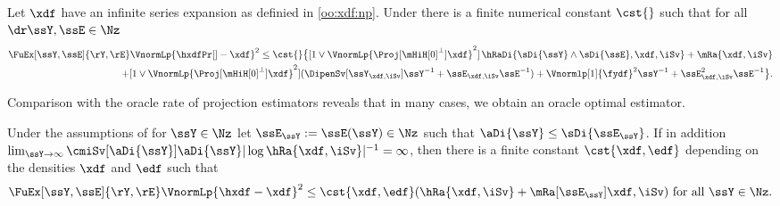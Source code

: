 \begin{thm}\label{THM_FREQ_CIRCDECONV_UNKNOWN_IID_ORACLE_NP}
\label{re:au:ub:np} Let $\xdf$ have an infinite series expansion
  as definied in \ref{oo:xdf:np}. Under  there is a finite numerical
  constant $\cst{}$ such that for all $\dr\ssY,\ssE\in\Nz$
\begin{multline}\label{re:au:ub:np:e1}
\FuEx[\ssY,\ssE]{\rY,\rE}\VnormLp{\hxdfPr[]-\xdf}^2\leq
\cst{}\big\{[1\vee\VnormLp{\Proj[{\mHiH[0]^\perp}]\xdf}^2]\,\hRaDi{\sDi{\ssY}\wedge\sDi{\ssE},\xdf,\iSv}+\mRa{\xdf,\iSv}\\
\hfill+[1\vee\VnormLp{\Proj[{\mHiH[0]^\perp}]\xdf}^2](\DipenSv[\ssY_{\xdf,\iSv}]\ssY^{-1}+\ssE_{\xdf,\iSv}\ssE^{-1})+\Vnormlp[1]{\fydf}^2\ssY^{-1}+\ssE_{\xdf,\iSv}^2\ssE^{-1}\big\}.
\end{multline}
\end{thm}

Comparison with the oracle rate of projection estimators reveals that in many cases, we obtain an oracle optimal estimator.

\begin{cor}\label{COR_FREQ_CIRCDECONV_UNKNOWN_IID_ORACLE_NP}
Under the assumptions of
    for  $\ssY\in\Nz$ let
  $\ssE_{\ssY}:=\ssE(\ssY)\in\Nz$ such that
  $\aDi{\ssY}\leq\sDi{\ssE_{\ssY}}$. If in addition
  $\lim_{\ssY\to\infty}\cmiSv[\aDi{\ssY}]\aDi{\ssY}|\log\hRa{\xdf,\iSv}|^{-1}=\infty$, then there is a finite constant $\cst{\xdf,\edf}$ depending on the densities 
$\xdf$ and $\edf$ such that
\begin{equation*}
\FuEx[\ssY,\ssE]{\rY,\rE}\VnormLp{\hxdf-\xdf}^2\leq\cst{\xdf,\edf}(\hRa{\xdf,\iSv}+\mRa[\ssE_{\ssY}]{\xdf,\iSv})\text{
  for all } \ssY\in\Nz .
\end{equation*}
\end{cor}

